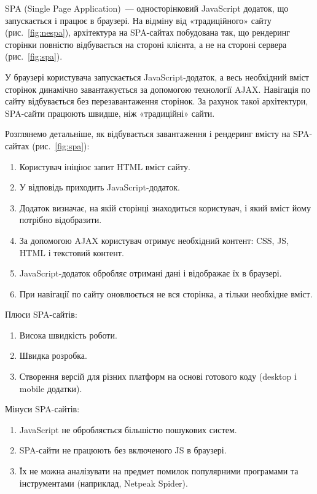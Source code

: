 SPA (Single Page Application)~--- односторінковий JavaScript додаток, що запускається і працює в браузері. На відміну від «традиційного» сайту (рис.~\ref{fig:nespa}), архітектура на SPA-сайтах побудована так, що рендеринг сторінки повністю відбувається на стороні клієнта, а не на стороні сервера (рис.~\ref{fig:spa}).

У браузері користувача запускається JavaScript-додаток, а весь необхідний вміст сторінок динамічно завантажується за допомогою технології AJAX. Навігація по сайту відбувається без перезавантаження сторінок. За рахунок такої архітектури, SPA-сайти працюють швидше, ніж «традиційні» сайти.



Розглянемо детальніше, як відбувається завантаження і рендеринг вмісту на SPA-сайтах (рис.~\ref{fig:spa}):

\begin{enumerate}
  \item Користувач ініціює запит HTML вміст сайту.
  \item У відповідь приходить JavaScript-додаток.
  \item Додаток визначає, на якій сторінці знаходиться користувач, і який вміст йому потрібно відобразити.
  \item За допомогою AJAX користувач отримує необхідний контент: CSS, JS, HTML і текстовий контент.
  \item JavaScript-додаток обробляє отримані дані і відображає їх в браузері.
  \item При навігації по сайту оновлюється не вся сторінка, а тільки необхідне вміст.
\end{enumerate}

Плюси SPA-сайтів:

\begin{enumerate}
  \item Висока швидкість роботи.
  \item Швидка розробка.
  \item Створення версій для різних платформ на основі готового коду (desktop і mobile додатки).
\end{enumerate}

Мінуси SPA-сайтів:

\begin{enumerate}
  \item JavaScript не обробляється більшістю пошукових систем.
  \item SPA-сайти не працюють без включеного JS в браузері.
  \item Їх не можна аналізувати на предмет помилок популярними програмами та інструментами (наприклад, Netpeak Spider).
\end{enumerate}
